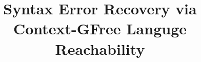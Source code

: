 \documentclass{sig-alternate-05-2015}
\begin{document}
%

\title{Syntax Error Recovery via Context-GFree Languge Reachability}
%
%
%
%
%
\end{document}
